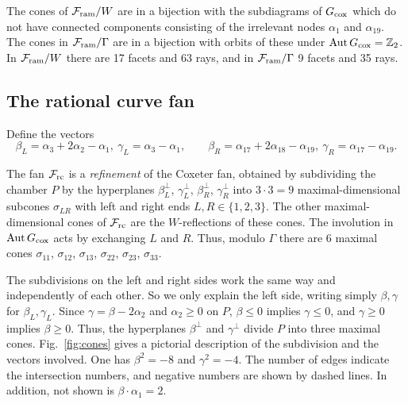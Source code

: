 \documentclass[table,x11names]{amsart}
\begin{document}
The cones of ${\mathcal F}_{\rm ram}/W$ are in a bijection with the subdiagrams of
$G_{\rm cox}$ which do not have connected components consisting of the
irrelevant nodes $\alpha_1$ and $\alpha_{19}$.  The cones in
${\mathcal F}_{\rm ram}/\Gamma$ are in a bijection with orbits of these under
$\operatorname{Aut} G_{\rm cox}={\mathbb Z}_2$.  In ${\mathcal F}_{\rm ram}/W$ there are 17 facets and 63 rays, and
in ${\mathcal F}_{\rm ram}/\Gamma$ 9 facets and 35 rays.

 \subsection{The rational curve fan}
\label{sec:rc-fan}

Define the vectors
\begin{displaymath}
  \beta_L = \alpha_3+2\alpha_2-\alpha_1,\ 
  \gamma_L = \alpha_3-\alpha_1, 
  \qquad
  \beta_R = \alpha_{17}+2\alpha_{18}-\alpha_{19},\ 
  \gamma_R = \alpha_{17}-\alpha_{19}.
\end{displaymath}

The fan ${\mathcal F}_{\rm rc}$ is a \emph{refinement} of the Coxeter fan, obtained
by subdividing the chamber $P$ by the hyperplanes $\beta_L^\perp$,
$\gamma_L^\perp$, $\beta_R^\perp$, $\gamma_R^\perp$ 
into $3\cdot 3 = 9$
maximal-dimensional subcones $\sigma_{LR}$ with  left and right ends
$L,R\in \{1,2,3\}$. The other maximal-dimensional cones of
${\mathcal F}_{\rm rc}$ are the $W$-reflections of these cones. The involution in
$\operatorname{Aut} G_{\rm cox}$ acts by exchanging $L$ and $R$. Thus, modulo $\Gamma$ there
are 6 maximal cones $\sigma_{11}$, $\sigma_{12}$, $\sigma_{13}$, $\sigma_{22}$,
$\sigma_{23}$, $\sigma_{33}$.


The subdivisions on the left
and right sides work the same way and independently of each
other. So we only explain the left side,
writing simply $\beta,\gamma$ for $\beta_L,\gamma_L$.
Since $\gamma = \beta - 2\alpha_2$ and $\alpha_2\ge0$ on $P$, $\beta\le 0$ implies
$\gamma\le0$, and $\gamma\ge0$ implies $\beta\ge0$. Thus, the hyperplanes
$\beta^\perp$ and $\gamma^\perp$ divide $P$ into three maximal
cones.
Fig.~\ref{fig:cones} gives a pictorial description of the
subdivision and the vectors involved. One has $\beta^2=-8$ and
$\gamma^2=-4$. The number of edges indicate the intersection numbers,
and negative numbers are shown by dashed lines.
In addition, not shown is $\beta\cdot\alpha_1=2$.
\end{document}
